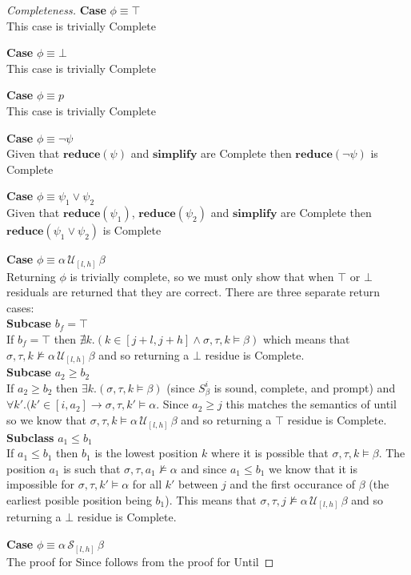 \documentclass[10pt,a4paper]{article}
\begin{document}
\begin{proof}[Completeness]

\noindent \textbf{Case} $\phi \equiv \top$ \\
This case is trivially Complete

\noindent \textbf{Case} $\phi \equiv \bot$ \\
This case is trivially Complete

\noindent \textbf{Case} $\phi \equiv p$ \\
This case is trivially Complete

\noindent \textbf{Case} $\phi \equiv \neg \psi$ \\
Given that $\mathbf{reduce}(\psi)$ and $\mathbf{simplify}$ are Complete then $\mathbf{reduce}(\neg \psi)$ is Complete

\noindent \textbf{Case} $\phi \equiv \psi_1 \vee \psi_2$ \\
Given that $\mathbf{reduce}(\psi_1)$, $\mathbf{reduce}(\psi_2)$ and $\mathbf{simplify}$ are Complete then $\mathbf{reduce}(\psi_1 \vee \psi_2)$ is Complete

\noindent \textbf{Case} $\phi \equiv \alpha\, \mathcal{U}_{[l,h]}\, \beta$ \\
Returning $\phi$ is trivially complete, so we must only show that when $\top$ or $\bot$ residuals are returned that they are correct. There are three separate return cases: \\
\textbf{Subcase} $b_f = \top$ \\
If $b_f = \top$ then $\nexists k.(k \in [j+l,j+h] \wedge \sigma, \tau, k \vDash \beta)$ which means that $\sigma, \tau, k \nvDash \alpha\, \mathcal{U}_{[l,h]}\, \beta$ and so returning a $\bot$ residue is Complete. \\
\textbf{Subcase} $a_2 \geq b_2$ \\
If $a_2 \geq b_2$ then $\exists k.(\sigma, \tau, k \vDash \beta)$ (since $S^i_\beta$ is sound, complete, and prompt) and $\forall k'.(k' \in [i,a_2] \rightarrow \sigma, \tau, k' \vDash \alpha$. Since $a_2 \geq j$ this matches the semantics of until so we know that $\sigma, \tau, k \vDash \alpha\, \mathcal{U}_{[l,h]}\, \beta$ and so returning a $\top$ residue is Complete. \\
\textbf{Subclass} $a_1 \leq b_1$ \\
If $a_1 \leq b_1$ then $b_1$ is the lowest position $k$ where it is possible that $\sigma, \tau, k \vDash \beta$. The position $a_1$ is such that $\sigma, \tau, a_1 \nvDash \alpha$ and since $a_1 \leq b_1$ we know that it is impossible for $\sigma, \tau, k' \vDash \alpha$ for all $k'$ between $j$ and the first occurance of $\beta$ (the earliest posible position being $b_1$). This means that $\sigma, \tau, j \nvDash \alpha\, \mathcal{U}_{[l,h]}\, \beta$ and so returning a $\bot$ residue is Complete.


\noindent \textbf{Case} $\phi \equiv \alpha\, \mathcal{S}_{[l,h]}\, \beta$ \\
The proof for Since follows from the proof for Until
\end{proof}
\end{document}

